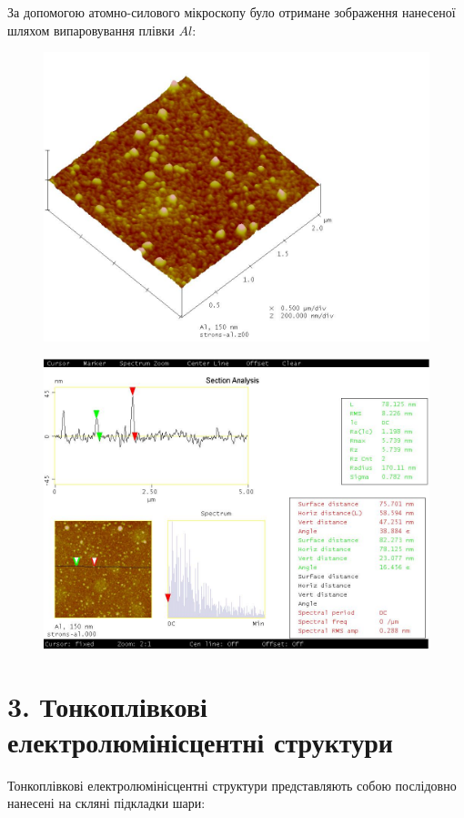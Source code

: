 \documentclass[a4paper, 14pt]{extarticle}
\begin{document}
\newpage

За допомогою атомно-силового мікроскопу було отримане зображення нанесеної шляхом випаровування плівки $Al$:
\begin{figure}[H]
  \includegraphics[width=130mm]{./img/afm_al/afm-al-6.jpg}
\end{figure}

\begin{figure}[H]
  \includegraphics[width=130mm]{./img/afm_al/afm-al-4.jpg}
\end{figure}

\newpage

\section{3. Тонкоплівкові електролюмінісцентні структури}
Тонкоплівкові електролюмінісцентні структури представляють собою послідовно нанесені на скляні підкладки шари:
\end{document}
